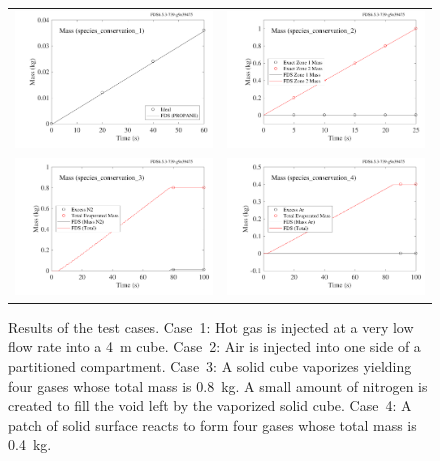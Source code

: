\documentclass[11pt]{book}
\begin{document}
\begin{figure}[ht]
\begin{tabular*}{\textwidth}{lr}
\includegraphics[width=3.2in]{SCRIPT_FIGURES/species_conservation_1} &
\includegraphics[width=3.2in]{SCRIPT_FIGURES/species_conservation_2} \\
\includegraphics[width=3.2in]{SCRIPT_FIGURES/species_conservation_3} &
\includegraphics[width=3.2in]{SCRIPT_FIGURES/species_conservation_4}
\end{tabular*}
\caption[The  test cases]{Results of the  test cases. Case~1: Hot gas is injected at a very low flow rate into a 4~m cube. Case~2: Air is injected into one side of a partitioned compartment. Case~3: A solid cube vaporizes yielding four gases whose total mass is 0.8~kg. A small amount of nitrogen is created to fill the void left by the vaporized solid cube. Case~4: A patch of solid surface reacts to form four gases whose total mass is 0.4~kg.}
\label{species_conservation}
\end{figure}
\end{document}
